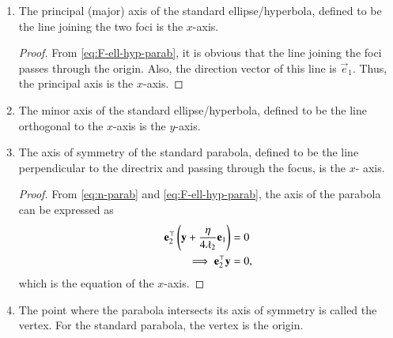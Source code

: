 \begin{enumerate}[label=\thesubsection.\arabic*.,ref=\thesubsection.\theenumi]
	\item
		\label{corr:axis}
			The principal (major) axis of the standard ellipse/hyperbola, defined to be the line joining the two foci   is the $x$-axis.  
	
	\begin{proof}
		From 	\eqref{eq:F-ell-hyp-parab}, it is obvious that the line joining the foci passes through the origin.  Also, the direction vector of this line is $\vec{e}_1$.  Thus, the principal axis is the $x$-axis. 
	\end{proof}
	\item
		\label{corr:minor-axis}
			The minor axis of the standard ellipse/hyperbola, defined to be the line orthogonal to the $x$-axis is the $y$-axis. 
	


	\item
			The axis of symmetry of the standard parabola, defined to be the line perpendicular to the directrix and passing through the focus,  is the $x$- axis.
	
	\begin{proof}
	From \eqref{eq:n-parab} and 	
					\eqref{eq:F-ell-hyp-parab}, 
					the axis of the parabola  can be expressed 
     as 
		\begin{align}
			\mathbf{e}_2^{\top}\left(\mathbf{y}  
			+\frac{\eta}{4\lambda_2}\mathbf{e}_1\right) &= 0
			\\
			\implies \mathbf{e}_2^{\top}\mathbf{y} &= 0
					\label{eq:axis-std-parab}, 
		\end{align}
		which is the equation of the $x$-axis.
	\end{proof}


	\item
			\label{corr:center-parab}
 The point where the parabola intersects its axis of symmetry is called the vertex. For the standard parabola, the vertex is the origin.
	

\end{enumerate}
